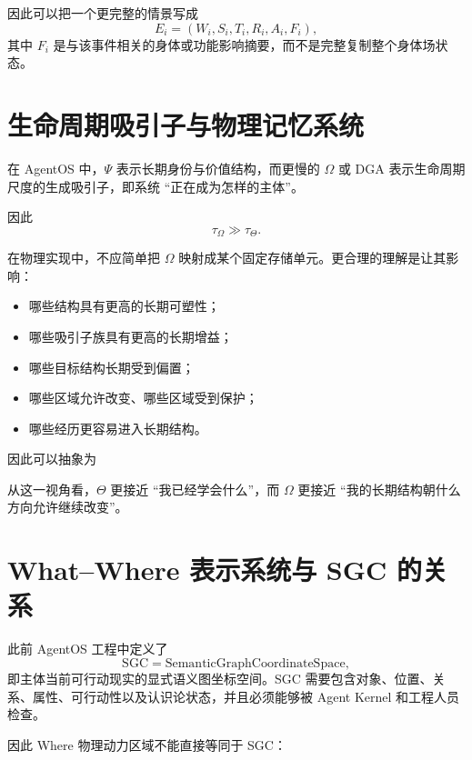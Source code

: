 因此可以把一个更完整的情景写成
\[
E_i
=
(
W_i,
S_i,
T_i,
R_i,
A_i,
F_i
),
\]
其中 $F_i$ 是与该事件相关的身体或功能影响摘要，而不是完整复制整个身体场状态。

\section{生命周期吸引子与物理记忆系统}

在 AgentOS 中，$\Psi$ 表示长期身份与价值结构，而更慢的 $\Omega$ 或 DGA 表示生命周期尺度的生成吸引子，即系统 ``正在成为怎样的主体''。

因此
\[
\tau_\Omega\gg\tau_\Theta.
\]

在物理实现中，不应简单把 $\Omega$ 映射成某个固定存储单元。更合理的理解是让其影响：

\begin{itemize}
    \item 哪些结构具有更高的长期可塑性；
    \item 哪些吸引子族具有更高的长期增益；
    \item 哪些目标结构长期受到偏置；
    \item 哪些区域允许改变、哪些区域受到保护；
    \item 哪些经历更容易进入长期结构。
\end{itemize}

因此可以抽象为
\begin{statementbox}
\centering
{}
\end{statementbox}

从这一视角看，$\Theta$ 更接近 ``我已经学会什么''，而 $\Omega$ 更接近 ``我的长期结构朝什么方向允许继续改变''。

\section{What--Where 表示系统与 SGC 的关系}

此前 AgentOS 工程中定义了
\[
\mathrm{SGC}
=
\mathrm{SemanticGraphCoordinateSpace},
\]
即主体当前可行动现实的显式语义图坐标空间。SGC 需要包含对象、位置、关系、属性、可行动性以及认识论状态，并且必须能够被 Agent Kernel 和工程人员检查。

因此 Where 物理动力区域不能直接等同于 SGC：
\begin{statementbox}
\centering
{}
\end{statementbox}

